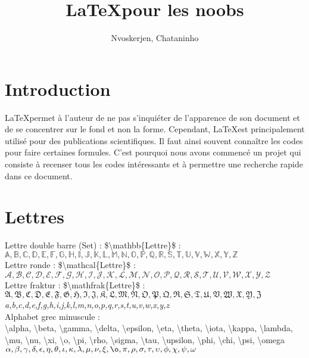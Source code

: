 \documentclass{article}
\begin{document}
\title{\LaTeX pour les noobs}
\author{Nvoskerjen, Chataninho}
\maketitle


\vspace{40mm}





\pagebreak

\section{Introduction}


\LaTeX permet à l'auteur de ne pas s'inquiéter de l'apparence de son document et de se concentrer sur le fond et non la forme. Cependant, \LaTeX est principalement utilisé pour des publications scientifiques. Il faut ainsi souvent connaître les codes pour faire certaines formules. C'est pourquoi nous avons commencé un projet qui consiste à recenser tous les codes intéressants et à permettre une recherche rapide dans ce document.

\section{Lettres}
Lettre double barre (Set) : \$\textbackslash mathbb\{Lettre\}\$ :\\
$\mathbb{A,B,C,D,E,F,G,H,I,J,K,L,M,N,O,P,Q,R,S,T,U,V,W,X,Y,Z}$\\
Lettre ronde : \$\textbackslash mathcal\{Lettre\}\$ :\\
$\mathcal{A,B,C,D,E,F,G,H,I,J,K,L,M,N,O,P,Q,R,S,T,U,V,W,X,Y,Z}$\\
Lettre fraktur : \$\textbackslash mathfrak\{Lettre\}\$ :\\
$\mathfrak{A,B,C,D,E,F,G,H,I,J,K,L,M,N,O,P,Q,R,S,T,U,V,W,X,Y,Z}$\\
\emph{a,b,c,d,e,f,g,h,i,j,k,l,m,n,o,p,q,r,s,t,u,v,w,x,y,z}\\
Alphabet grec minuscule :\\
\textbackslash alpha, \textbackslash beta, \textbackslash gamma, \textbackslash delta, \textbackslash epsilon, \textbackslash eta, \textbackslash theta, \textbackslash iota, \textbackslash kappa, \textbackslash lambda, \textbackslash mu, \textbackslash nu, \textbackslash xi, \textbackslash o, \textbackslash pi, \textbackslash rho, \textbackslash sigma, \textbackslash tau, \textbackslash upsilon, \textbackslash phi, \textbackslash chi, \textbackslash psi, \textbackslash omega\\
$\alpha, \beta, \gamma, \delta, \epsilon, \eta, \theta, \iota, \kappa, \lambda, \mu, \nu, \xi, \o, \pi, \rho, \sigma, \tau, \upsilon, \phi, \chi, \psi, \omega$\\
\end{document}
